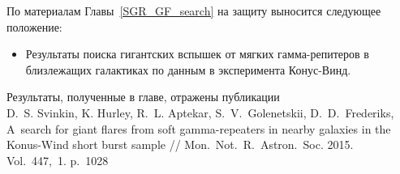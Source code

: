 По материалам Главы~\ref{SGR_GF_search} на защиту выносится следующее положение:
\begin{itemize}
\item Результаты поиска гигантских вспышек от мягких гамма-репитеров 
    в близлежащих галактиках по данным в эксперимента Конус-Винд. 
\end{itemize}

Результаты, полученные в главе, отражены публикации\\
D.~S. Svinkin, K. Hurley, R.~L. Aptekar, S.~V.~Golenetskii, D.~D.~Frederiks, 
A~search for giant flares from soft gamma-repeaters in nearby galaxies in the 
Konus-Wind short burst sample // Mon.~Not.~R.~Astron.~Soc. 2015. Vol.~447,~1. p.~1028

\clearpage